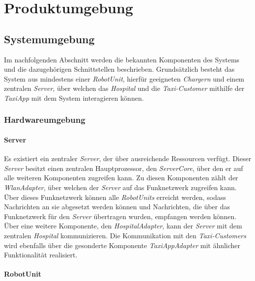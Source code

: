 \section{Produktumgebung}

  \subsection{Systemumgebung}
  Im nachfolgenden Abschnitt werden die bekannten Komponenten des Systems und die dazugehörigen Schnittstellen beschrieben.
  Grundsätzlich besteht das System aus mindestens einer \emph{RobotUnit}, hierfür geeigneten \emph{Chargern} und einem zentralen \emph{Server}, über welchen das \emph{Hospital} und die \emph{Taxi-Customer} mithilfe der \emph{TaxiApp} mit dem System interagieren können.

  \subsubsection{Hardwareumgebung}

    \paragraph{Server}\label{server}

    Es existiert ein zentraler \emph{Server}, der über ausreichende Ressourcen verfügt.
    Dieser \emph{Server} besitzt einen zentralen Hauptprozessor, den \emph{ServerCore}, über den er auf alle weiteren Komponenten zugreifen kann.
    Zu diesen Komponenten zählt der \emph{WlanAdapter}, über welchen der \emph{Server} auf das Funknetzwerk zugreifen kann.
    Über dieses Funknetzwerk können alle \emph{RobotUnits} erreicht werden, sodass Nachrichten an sie abgesetzt werden können und Nachrichten, die über das Funknetzwerk für den \emph{Server} übertragen wurden, empfangen werden können.
    Über eine weitere Komponente, den \emph{HospitalAdapter}, kann der \emph{Server} mit dem zentralen \emph{Hospital} kommunizieren.
    Die Kommunikation mit den \emph{Taxi-Customers} wird ebenfalls über die gesonderte Komponente \emph{TaxiAppAdapter} mit ähnlicher Funktionalität realisiert.

    \paragraph{RobotUnit}\label{robotunit}

